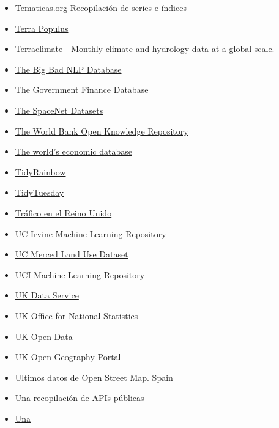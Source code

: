 \documentclass[
]{article}
\begin{document}
\begin{itemize}
{  Sciences}
\item
  \href{https://tematicas.org/}{Tematicas.org Recopilación de series e
  índices}
\item
  \href{https://terra.ipums.org/}{Terra Populus}
\item
  \href{https://www.climatologylab.org/terraclimate.html}{Terraclimate}
  - Monthly climate and hydrology data at a global scale.
\item
  \href{https://datasets.quantumstat.com/}{The Big Bad NLP Database}
\item
  \href{https://willamette.edu/mba/research-impact/public-datasets/index.html}{The
  Government Finance Database}
\item
  \href{https://spacenet.ai/datasets/}{The SpaceNet Datasets}
\item
  \href{https://openknowledge.worldbank.org}{The World Bank Open
  Knowledge Repository}
\item
  \href{https://db.nomics.world/}{The world's economic database}
\item
  \href{https://github.com/r-lgbtq/tidyrainbow}{TidyRainbow}
\item
  \href{https://github.com/rfordatascience/tidytuesday}{TidyTuesday}
\item
  \href{https://webarchive.nationalarchives.gov.uk/ukgwa/*/http://www.dft.gov.uk/traffic-counts/}{Tráfico
  en el Reino Unido}
\item
  \href{https://archive.ics.uci.edu/datasets}{UC Irvine Machine Learning
  Repository}
\item
  \href{http://weegee.vision.ucmerced.edu/datasets/landuse.html}{UC
  Merced Land Use Dataset}
\item
  \href{http://archive.ics.uci.edu/ml/}{UCI Machine Learning Repository}
\item
  \href{https://ukdataservice.ac.uk/}{UK Data Service}
\item
  \href{https://www.ons.gov.uk/}{UK Office for National Statistics}
\item
  \href{https://data.gov.uk/search}{UK Open Data}
\item
  \href{https://geoportal.statistics.gov.uk/}{UK Open Geography Portal}
\item
  \href{https://download.geofabrik.de/europe/spain.html}{Ultimos datos
  de Open Street Map. Spain}
\item
  \href{https://github.com/toddmotto/public-apis}{Una recopilación de
  APIs públicas}
\item
  \href{https://github.com/caesar0301/awesome-public-datasets}{Una
}
\end{itemize}
\end{document}
